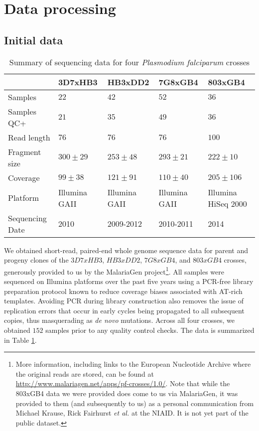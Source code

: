 \section{Data processing}

\subsection{Initial data}

\begin{table}[]
\centering
\caption{Summary of sequencing data for four \textit{Plasmodium falciparum} crosses}
\label{tbl:crosssummary}
\begin{tabular}{@{}lllll@{}}
\toprule
                & 3D7xHB3       & HB3xDD2       & 7G8xGB4       & 803xGB4             \\ \midrule
Samples         & $22$          & $42$          & $52$          & $36$                \\
Samples QC+     & $21$          & $35$          & $49$          & $36$                \\
Read length     & $76$          & $76$          & $76$          & $100$               \\
Fragment size   & $300 \pm 29$  & $253 \pm 48$  & $293 \pm 21$  & $222 \pm 10$        \\
Coverage        & $99  \pm 38$  & $121 \pm 91$  & $110 \pm 40$  & $205 \pm 106$       \\
Platform        & Illumina GAII & Illumina GAII & Illumina GAII & Illumina HiSeq 2000 \\
Sequencing Date & 2010          & 2009-2012     & 2010-2011     & 2014                \\ \bottomrule
\end{tabular}
\end{table}

We obtained short-read, paired-end whole genome sequence data for parent and progeny clones of the $3D7xHB3$\cite{Walliker:1987cv}, $HB3xDD2$\cite{Wellems:1990eg}, $7G8xGB4$\cite{Hayton:2008hn}, and $803xGB4$ crosses, generously provided to us by the MalariaGen project\footnote{More information, including links to the European Nucleotide Archive where the original reads are stored, can be found at \url{http://www.malariagen.net/apps/pf-crosses/1.0/}.  Note that while the 803xGB4 data we were provided does come to us via MalariaGen, it was provided to them (and subsequently to us) as a personal communication from Michael Krause, Rick Fairhurst \textit{et al.} at the NIAID.  It is not yet part of the public dataset.}.  All samples were sequenced on Illumina platforms over the past five years using a PCR-free library preparation protocol known to reduce coverage biases associated with AT-rich templates.  Avoiding PCR during library construction also removes the issue of replication errors that occur in early cycles being propagated to all subsequent copies, thus masquerading as \textit{de novo} mutations.  Across all four crosses, we obtained $152$ samples prior to any quality control checks.  The data is summarized in Table \ref{tbl:crosssummary}.

